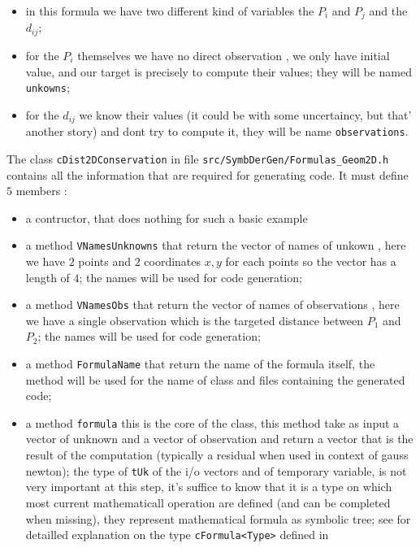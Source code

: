 \begin{itemize}
   \item in this formula we have two different kind of variables the $P_i$ and $P_j$
         and the $d_{ij}$;
         
   \item for the $P_i$ themselves we have no direct observation , we only have initial value,
         and our target is precisely to compute their values; they will be named {\tt unkowns};

   \item for the $d_{ij}$ we know their values (it could be with some uncertaincy, but that'
         another story) and dont try to compute it, they will be name {\tt observations}.
\end{itemize}

The class {\tt cDist2DConservation} in file  {\tt src/SymbDerGen/Formulas\_Geom2D.h } contains
all the information that are required for generating code. It must define $5$ members :

\begin{itemize}
   \item a contructor, that does nothing for such a basic example

   \item a method {\tt VNamesUnknowns} that return the vector of names of unkown ,
         here we have $2$ points and $2$ coordinates $x,y$ for each points so the
         vector has a length of $4$;  the names will be used for code generation;

   \item a method {\tt VNamesObs} that return the vector of names of observations ,
         here we have a single observation which is the targeted distance between 
         $P_1$ and $P_2$;  the names will be used for code generation;

   \item a method {\tt FormulaName}  that return the name of the formula itself,
         the method will be used for the name of class and files containing the generated
          code;

   \item a method {\tt formula}  this is the core of the class, this method
         take as input a vector of unknown and a vector of observation and return
         a vector that is the result of the  computation  (typically a residual
         when used in context of gauss newton);  the type of {\tt tUk} of the
         i/o vectors and of temporary variable, is not very important at this step,
         it's suffice to know that it is a type on which most current mathematicall
         operation are defined (and can be completed when missing), they represent
         mathematical formula as symbolic tree; see \RefFantome for detailled
         explanation on the type {\tt cFormula<Type>} defined in 

\end{itemize}

